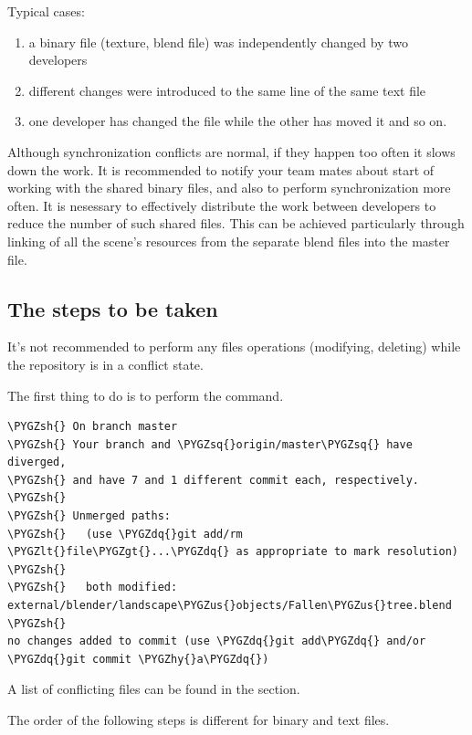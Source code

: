 \documentclass[a4paper,12pt,oneside]{sphinxmanual}
\def\PYGZus{\char`\_}
\def\PYGZlt{\char`\<}
\def\PYGZgt{\char`\>}
\def\PYGZsh{\char`\#}
\def\PYGZhy{\char`\-}
\def\PYGZsq{\char`\'}
\def\PYGZdq{\char`\"}
\begin{document}
Typical cases:
\begin{enumerate}
\item {} 
a binary file (texture, blend file) was independently changed by two developers

\item {} 
different changes were introduced to the same line of the same text file

\item {} 
one developer has changed the file while the other has moved it and so on.

\end{enumerate}

Although synchronization conflicts are normal, if they happen too often it slows down the work. It is recommended to notify your team mates about start of working with the shared binary files, and also to perform synchronization more often. It is nesessary to effectively distribute the work between developers to reduce the number of such shared files. This can be achieved particularly through linking of all the scene's resources from the separate blend files into the master file.


\subsection{The steps to be taken}
\label{git_short_manual:id18}
It's not recommended to perform any files operations (modifying, deleting) while the repository is in a conflict state.

The first thing to do is to perform the  command.

\begin{Verbatim}[commandchars=\\\{\}]
\PYGZsh{} On branch master
\PYGZsh{} Your branch and \PYGZsq{}origin/master\PYGZsq{} have diverged,
\PYGZsh{} and have 7 and 1 different commit each, respectively.
\PYGZsh{}
\PYGZsh{} Unmerged paths:
\PYGZsh{}   (use \PYGZdq{}git add/rm \PYGZlt{}file\PYGZgt{}...\PYGZdq{} as appropriate to mark resolution)
\PYGZsh{}
\PYGZsh{}   both modified:      external/blender/landscape\PYGZus{}objects/Fallen\PYGZus{}tree.blend
\PYGZsh{}
no changes added to commit (use \PYGZdq{}git add\PYGZdq{} and/or \PYGZdq{}git commit \PYGZhy{}a\PYGZdq{})
\end{Verbatim}

A list of conflicting files can be found in the  section.

The order of the following steps is different for binary and text files.
\end{document}
